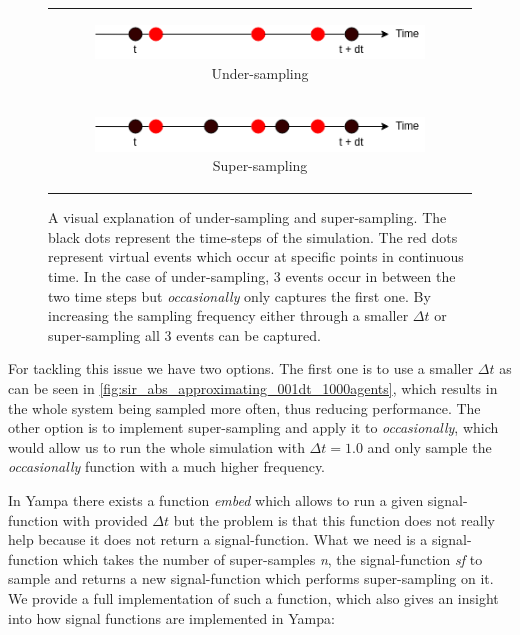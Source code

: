 \begin{figure}
\begin{center}
	\begin{tabular}{c}
		\begin{subfigure}[b]{0.5\textwidth}
			\centering
			\includegraphics[width=1\textwidth, angle=0]{./fig/timedriven/undersampling.png}
			\caption{Under-sampling}
			\label{fig:undersampling}
		\end{subfigure}
		
		\\
		
		\begin{subfigure}[b]{0.5\textwidth}
			\centering
			\includegraphics[width=1\textwidth, angle=0]{./fig/timedriven/supersampling.png}
			\caption{Super-sampling}
			\label{fig:supersampling}
		\end{subfigure}
	\end{tabular}
	
	\caption{A visual explanation of under-sampling and super-sampling. The black dots represent the time-steps of the simulation. The red dots represent virtual events which occur at specific points in continuous time. In the case of under-sampling, 3 events occur in between the two time steps but \textit{occasionally} only captures the first one. By increasing the sampling frequency either through a smaller $\Delta t$ or super-sampling all 3 events can be captured.} 
	\label{fig:sampling_issue}
\end{center}
\end{figure}

For tackling this issue we have two options. The first one is to use a smaller $\Delta t$ as can be seen in \ref{fig:sir_abs_approximating_001dt_1000agents}, which results in the whole system being sampled more often, thus reducing performance. The other option is to implement super-sampling and apply it to \textit{occasionally}, which would allow us to run the whole simulation with $\Delta t = 1.0$ and only sample the \textit{occasionally} function with a much higher frequency.

In Yampa there exists a function \textit{embed} which allows to run a given signal-function with provided $\Delta t$ but the problem is that this function does not really help because it does not return a signal-function. What we need is a signal-function which takes the number of super-samples \textit{n}, the signal-function \textit{sf} to sample and returns a new signal-function which performs super-sampling on it. We provide a full implementation of such a function, which also gives an insight into how signal functions are implemented in Yampa:

